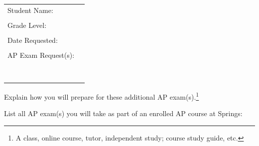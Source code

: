 \vspace{1cm}

\begin{tabular}{ll}
Student Name: & \underline{\hspace{7cm}}\\
&\\
Grade Level:  & \underline{\hspace{7cm}}\\
&\\
Date Requested: &  \underline{\hspace{7cm}}\\
&\\
AP Exam Request(s): & \underline{\hspace{7cm}}\\
&\\
& \underline{\hspace{7cm}}\\
&\\
& \underline{\hspace{7cm}}\\
&\\
& \underline{\hspace{7cm}}\\
&\\
& \underline{\hspace{7cm}}
\end{tabular}

\vspace{1cm}

\noindent Explain how you will prepare for these additional AP exam(s).\footnote{A class, online course, tutor, independent study; course study guide, etc.}








\vspace{4cm}
\noindent List all AP exam(s) you will take as part of an enrolled AP course at Springs:

